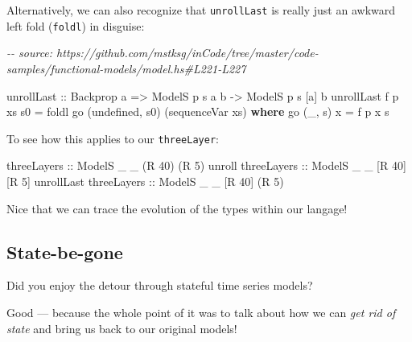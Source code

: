 \documentclass[]{article}
\newenvironment{Shaded}{}{}
\newcommand{\CommentTok}[1]{\textcolor[rgb]{0.38,0.63,0.69}{\textit{#1}}}
\newcommand{\DataTypeTok}[1]{\textcolor[rgb]{0.56,0.13,0.00}{#1}}
\newcommand{\DecValTok}[1]{\textcolor[rgb]{0.25,0.63,0.44}{#1}}
\newcommand{\FunctionTok}[1]{\textcolor[rgb]{0.02,0.16,0.49}{#1}}
\newcommand{\KeywordTok}[1]{\textcolor[rgb]{0.00,0.44,0.13}{\textbf{#1}}}
\newcommand{\NormalTok}[1]{#1}
\newcommand{\OtherTok}[1]{\textcolor[rgb]{0.00,0.44,0.13}{#1}}
\begin{document}
Alternatively, we can also recognize that \texttt{unrollLast} is really just an
awkward left fold (\texttt{foldl}) in disguise:

\begin{Shaded}
\begin{Highlighting}[]
\CommentTok{{-}{-} source: https://github.com/mstksg/inCode/tree/master/code{-}samples/functional{-}models/model.hs\#L221{-}L227}

\NormalTok{unrollLast\textquotesingle{}}
\OtherTok{    ::} \DataTypeTok{Backprop}\NormalTok{ a}
    \OtherTok{=\textgreater{}} \DataTypeTok{ModelS}\NormalTok{ p s  a  b}
    \OtherTok{{-}\textgreater{}} \DataTypeTok{ModelS}\NormalTok{ p s [a] b}
\NormalTok{unrollLast\textquotesingle{} f p xs s0 }\OtherTok{=}\NormalTok{ foldl\textquotesingle{} go (}\FunctionTok{undefined}\NormalTok{, s0) (sequenceVar xs)}
  \KeywordTok{where}
\NormalTok{    go (\_, s) x }\OtherTok{=}\NormalTok{ f p x s}
\end{Highlighting}
\end{Shaded}

To see how this applies to our \texttt{threeLayer}:

\begin{Shaded}
\begin{Highlighting}[]
\OtherTok{threeLayers            ::} \DataTypeTok{ModelS}\NormalTok{ \_ \_ (}\DataTypeTok{R} \DecValTok{40}\NormalTok{) (}\DataTypeTok{R} \DecValTok{5}\NormalTok{)}
\NormalTok{unroll}\OtherTok{     threeLayers ::} \DataTypeTok{ModelS}\NormalTok{ \_ \_ [}\DataTypeTok{R} \DecValTok{40}\NormalTok{] [}\DataTypeTok{R} \DecValTok{5}\NormalTok{]}
\NormalTok{unrollLast}\OtherTok{ threeLayers ::} \DataTypeTok{ModelS}\NormalTok{ \_ \_ [}\DataTypeTok{R} \DecValTok{40}\NormalTok{] (}\DataTypeTok{R} \DecValTok{5}\NormalTok{)}
\end{Highlighting}
\end{Shaded}

Nice that we can trace the evolution of the types within our langage!

\subsection{State-be-gone}\label{state-be-gone}

Did you enjoy the detour through stateful time series models?

Good --- because the whole point of it was to talk about how we can \emph{get
rid of state} and bring us back to our original models!
\end{document}
